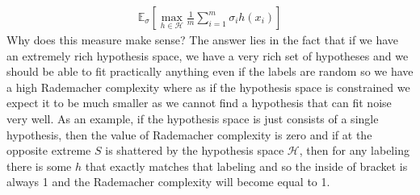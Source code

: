 \documentclass[10pt ]{article}
\begin{document}
\begin{align}
\mathbb{E}_{\sigma} \left[ \max_{h \in \mathcal{H}}  \frac{1}{m} \sum_{i=1}^m \sigma_i h(x_i) \right]
\label{eq_measure_new2}
\end{align}
Why does this measure make sense? The answer lies in the fact that if we have an extremely rich hypothesis space, we have a very rich set of hypotheses and we should be able to fit practically anything even if the labels are random so we have a high Rademacher complexity where as if the hypothesis space is constrained we expect it to be much smaller as we cannot find a hypothesis that can fit noise very well. As an example, if the hypothesis space is just consists of a single hypothesis, then the value of Rademacher complexity is zero and if at the opposite extreme $S$ is shattered by the hypothesis space $\mathcal{H}$, then for any labeling there is some $h$ that exactly matches that labeling and so the inside of bracket is always 1 and the Rademacher complexity will become equal to 1. 
\end{document}
